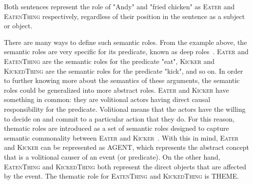 Both sentences represent the role of "Andy" and "fried chicken" as \textsc{Eater} and \textsc{EatenThing} respectively, regardless of their position in the sentence as a subject or object.

There are many ways to define such semantic roles. From the example above, the semantic roles are very specific for its predicate, known as deep roles~\citep{jurafsky2016speech}. \textsc{Eater} and \textsc{EatenThing} are the semantic roles for the predicate "eat", \textsc{Kicker} and \textsc{KickedThing} are the semantic roles for the predicate "kick", and so on. In order to further knowing more about the semantics of these arguments, the semantic roles could be generalized into more abstract roles. \textsc{Eater} and \textsc{Kicker} have something in common: they are volitional actors having direct causal responsibility for the predicate. Volitional means that the actors have the willing to decide on and commit to a particular action that they do. For this reason, thematic roles are introduced as a set of semantic roles designed to capture semantic commonality between \textsc{Eater} and \textsc{Kicker}~\citep{jurafsky2016speech}. With this in mind, \textsc{Eater} and \textsc{Kicker} can be represented as AGENT, which represents the abstract concept that is a volitional causer of an event (or predicate). On the other hand, \textsc{EatenThing} and \textsc{KickedThing} both represent the direct objects that are affected by the event. The thematic role for \textsc{EatenThing} and \textsc{KickedThing} is THEME.

